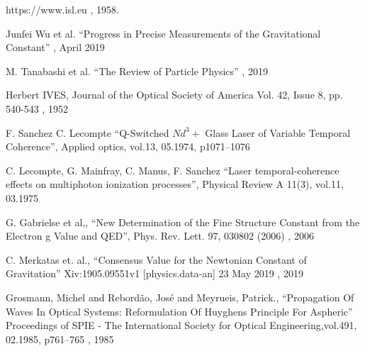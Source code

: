 \documentclass[a4paper,12pt]{article}
\begin{document}
\begin{appendix}
\begin{thebibliography}{1}
  https://www.isl.eu
, 1958.

  Junfei Wu et al. ``Progress in Precise Measurements of the Gravitational Constant''
, April 2019

 M. Tanabashi et al. ``The Review of Particle Physics''
, 2019

 Herbert IVES, Journal of the Optical Society of America Vol. 42, Issue 8, pp. 540-543 
, 1952

 F. Sanchez C. Lecompte ``Q-Switched $Nd^3+$ Glass Laser of Variable Temporal Coherence'', Applied optics, vol.13, 05.1974, p1071--1076

 C. Lecompte, G. Mainfray, C. Manus, F. Sanchez ``Laser temporal-coherence effects on multiphoton ionization processes'', Physical Review A 11(3), vol.11, 03.1975

 G. Gabrielse et al,, ``New Determination of the Fine Structure Constant from the Electron g Value and  QED'',  Phys. Rev. Lett. 97, 030802 (2006)
, 2006

 C. Merkatas et. al., ``Consensus Value for the Newtonian Constant of Gravitation'' Xiv:1905.09551v1 [physics.data-an] 23 May 2019
, 2019

 Grosmann, Michel and Rebordão, José and Meyrueis, Patrick., ``Propagation Of Waves In Optical Systems: Reformulation Of Huyghens Principle For Aspheric'' Proceedings of SPIE - The International Society for Optical Engineering,vol.491, 02.1985, p761--765
, 1985

\end{thebibliography}
\end{appendix}
\end{document}
